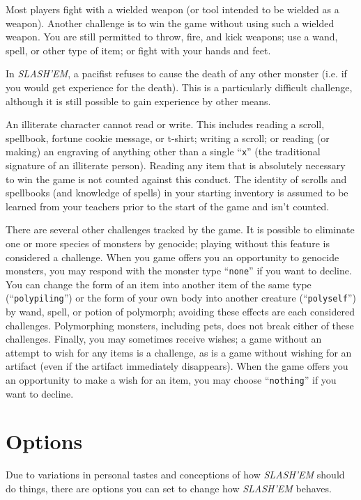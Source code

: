 Most players fight with a wielded weapon (or tool intended to be
wielded as a weapon).  Another challenge is to win the game without
using such a wielded weapon.  You are still permitted to throw,
fire, and kick weapons; use a wand, spell, or other type of item;
or fight with your hands and feet.

In {\it SLASH'EM}, a pacifist refuses to cause the death of any other monster
(i.e. if you would get experience for the death).  This is a particularly
difficult challenge, although it is still possible to gain experience
by other means.

An illiterate character cannot read or write.  This includes reading
a scroll, spellbook, fortune cookie message, or t-shirt; writing a
scroll; or reading (or
making) an engraving of anything other than a single ``{\tt x}'' (the
traditional signature of an illiterate person).  Reading
any item that is absolutely necessary to win the game is not counted
against this conduct.  The identity of scrolls and spellbooks (and
knowledge of spells) in your starting inventory is assumed to be
learned from your teachers prior to the start of the game and isn't
counted.

There are several other challenges tracked by the game.  It is possible
to eliminate one or more species of monsters by genocide; playing without
this feature is considered a challenge.  When you game offers you an
opportunity to genocide monsters, you may respond with the monster type
``{\tt none}'' if you want to decline.  You can change the form of an item into
another item of the same type (``{\tt polypiling}'') or the form of your own
body into another creature (``{\tt polyself}'') by wand, spell, or potion of
polymorph; avoiding these effects are each considered challenges.
Polymorphing monsters, including pets, does not break either of these
challenges.
Finally, you may sometimes receive wishes; a game without an attempt to
wish for any items is a challenge, as is a game without wishing for
an artifact (even if the artifact immediately disappears).  When the
game offers you an opportunity to make a wish for an item, you may
choose ``{\tt nothing}'' if you want to decline.

\section{Options}


Due to variations in personal tastes and conceptions of how {\it SLASH'EM\/}
should do things, there are options you can set to change how {\it SLASH'EM\/}
behaves.
